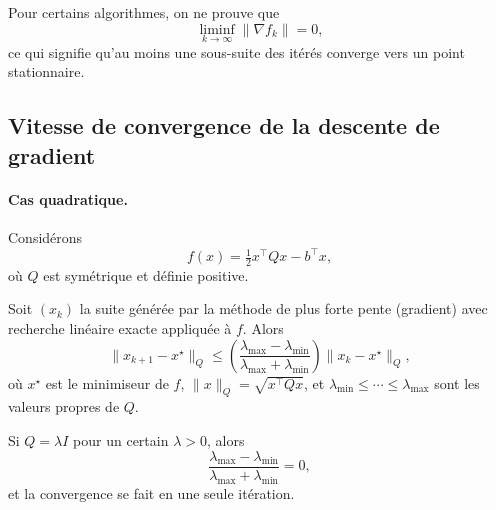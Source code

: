\begin{remarque}
Pour certains algorithmes, on ne prouve que
\[
    \liminf_{k\to\infty} \|\nabla f_k\| = 0,
\]
ce qui signifie qu’au moins une sous-suite des itérés converge vers un point
stationnaire.
\end{remarque}

\subsection{Vitesse de convergence de la descente de gradient}
\label{subsec:2.4.4}

\paragraph{Cas quadratique.}

Considérons
\[
    f(x) = \tfrac{1}{2} x^\top Q x - b^\top x,
\]
où $Q$ est symétrique et définie positive.

\begin{theoreme}[Luenberger]
\label{thm:Luenberger}
Soit $(x_k)$ la suite générée par la méthode de plus forte pente (gradient) avec
recherche linéaire exacte appliquée à $f$. Alors
\[
    \|x_{k+1} - x^\star\|_Q
    \le \left( \frac{\lambda_{\max} - \lambda_{\min}}
                    {\lambda_{\max} + \lambda_{\min}} \right)
       \|x_k - x^\star\|_Q,
\]
où $x^\star$ est le minimiseur de $f$, $\|x\|_Q = \sqrt{x^\top Q x}$, et
$\lambda_{\min} \le \cdots \le \lambda_{\max}$ sont les valeurs propres de $Q$.
\end{theoreme}

\begin{exemple}
Si $Q = \lambda I$ pour un certain $\lambda>0$, alors
\[
    \frac{\lambda_{\max} - \lambda_{\min}}
         {\lambda_{\max} + \lambda_{\min}} = 0,
\]
et la convergence se fait en une seule itération.
\end{exemple}

